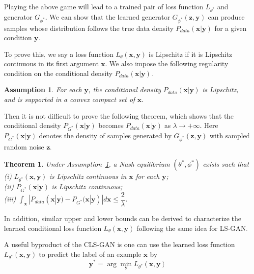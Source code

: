 \documentclass[11pt,fullpage, letterpaper,twoside]{article}
\newtheorem{theorem}{Theorem}
\newtheorem{assumption}{Assumption}
\newcommand{\1}[1]{\mathds{1}_{\left[#1\right]}}
\begin{document}
Playing the above game will lead to a trained pair of loss function $L_{\theta^*}$ and generator $G_{\phi^*}$.
We can show that the learned generator $G_{\phi^*}(\mathbf z, \mathbf y)$ can produce samples whose distribution follows the true data density $P_{data}(\mathbf x|\mathbf y)$ for a given condition $\mathbf y$.

To prove this, we say a loss function $L_\theta(\mathbf x, \mathbf y)$ is Lipschitz if it is Lipschitz continuous in its first argument $\mathbf x$. We also impose the following regularity condition on the conditional density $P_{data}(\mathbf x|\mathbf y)$.
\begin{assumption}\label{asp2}
For each $\mathbf y$, the conditional density $P_{data}(\mathbf x|\mathbf y)$ is Lipschitz, and is supported in a convex compact set of $\mathbf x$.
\end{assumption}

Then it is not difficult to prove the following theorem, which shows that the conditional density $P_{G^*}(\mathbf x|\mathbf y)$ becomes $P_{data}(\mathbf x|\mathbf y)$ as $\lambda\rightarrow +\infty$. Here $P_{G^*}(\mathbf x|\mathbf y)$ denotes the density of samples generated by $G_{\phi^*}(\mathbf z,\mathbf y)$ with sampled random noise $\mathbf z$.

\begin{theorem}\label{thm4}
Under Assumption~\ref{asp2}, a Nash equilibrium $(\theta^*,\phi^*)$ exists such that\\
(i) $L_{\theta^*}(\mathbf x,\mathbf y)$ is Lipschitz continuous in $\mathbf x$ for each $\mathbf y$;\\
(ii) $P_{G^*}(\mathbf x|\mathbf y)$ is Lipschitz continuous;\\
(iii) $\int_{\mathbf x}|P_{data}(\mathbf x|\mathbf y)-P_{G^*}(\mathbf x|\mathbf y)|d\mathbf x \leq \dfrac{2}{\lambda}$.
\end{theorem}

In addition, similar upper and lower bounds can be derived to characterize the learned conditional loss function $L_\theta(\mathbf x, \mathbf y)$ following the same idea for LS-GAN.

A useful byproduct of the CLS-GAN is one can use the learned loss function $L_{\theta^*}(\mathbf x, \mathbf y)$ to predict the label of an example $\mathbf x$ by
\begin{equation}
\mathbf y^* = \arg\min\limits_{\mathbf y} L_{\theta^*}(\mathbf x, \mathbf y)
\end{equation}
\end{document}
